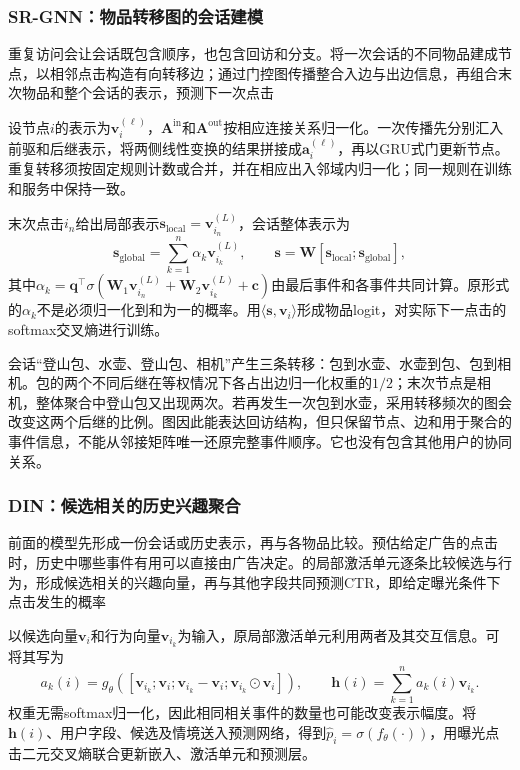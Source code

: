 \subsubsection{SR-GNN：物品转移图的会话建模}
\label{sec:rs-srgnn}

重复访问会让会话既包含顺序，也包含回访和分支。将一次会话的不同物品建成节点，以相邻点击构造有向转移边；通过门控图传播整合入边与出边信息，再组合末次物品和整个会话的表示，预测下一次点击

设节点$i$的表示为$\bm{v}_i^{(\ell)}$，$\bm{A}^{\mathrm{in}}$和$\bm{A}^{\mathrm{out}}$按相应连接关系归一化。一次传播先分别汇入前驱和后继表示，将两侧线性变换的结果拼接成$\bm{a}_i^{(\ell)}$，再以GRU式门更新节点。重复转移须按固定规则计数或合并，并在相应出入邻域内归一化；同一规则在训练和服务中保持一致。

末次点击$i_n$给出局部表示$\bm{s}_{\mathrm{local}}=\bm{v}_{i_n}^{(L)}$，会话整体表示为
\begin{equation}
  \bm{s}_{\mathrm{global}}=\sum_{k=1}^{n}\alpha_k\bm{v}_{i_k}^{(L)},
  \qquad
  \bm{s}=\bm{W}
  [\bm{s}_{\mathrm{local}};\bm{s}_{\mathrm{global}}],
  \label{eq:rs-srgnn-session}
\end{equation}
其中$\alpha_k=\bm{q}^{\top}\sigma(\bm{W}_1\bm{v}_{i_n}^{(L)}
+\bm{W}_2\bm{v}_{i_k}^{(L)}+\bm{c})$由最后事件和各事件共同计算。原形式的$\alpha_k$不是必须归一化到和为一的概率。用$\langle\bm{s},\bm{v}_i\rangle$形成物品logit，对实际下一点击的softmax交叉熵进行训练。

会话“登山包、水壶、登山包、相机”产生三条转移：包到水壶、水壶到包、包到相机。包的两个不同后继在等权情况下各占出边归一化权重的$1/2$；末次节点是相机，整体聚合中登山包又出现两次。若再发生一次包到水壶，采用转移频次的图会改变这两个后继的比例。图因此能表达回访结构，但只保留节点、边和用于聚合的事件信息，不能从邻接矩阵唯一还原完整事件顺序。它也没有包含其他用户的协同关系。

\subsubsection{DIN：候选相关的历史兴趣聚合}
\label{sec:rs-din}

前面的模型先形成一份会话或历史表示，再与各物品比较。预估给定广告的点击时，历史中哪些事件有用可以直接由广告决定。的局部激活单元逐条比较候选与行为，形成候选相关的兴趣向量，再与其他字段共同预测CTR，即给定曝光条件下点击发生的概率

以候选向量$\bm{v}_i$和行为向量$\bm{v}_{i_k}$为输入，原局部激活单元利用两者及其交互信息。可将其写为
\begin{equation}
  a_k(i)=g_\theta([\bm{v}_{i_k};\bm{v}_i;
            \bm{v}_{i_k}-\bm{v}_i;
            \bm{v}_{i_k}\odot\bm{v}_i]),\qquad
  \bm{h}(i)=\sum_{k=1}^{n}a_k(i)\bm{v}_{i_k}.
  \label{eq:rs-din-activation}
\end{equation}
权重无需softmax归一化，因此相同相关事件的数量也可能改变表示幅度。将$\bm{h}(i)$、用户字段、候选及情境送入预测网络，得到$\widehat p_i=\sigma(f_\theta(\cdot))$，用曝光点击二元交叉熵联合更新嵌入、激活单元和预测层。


